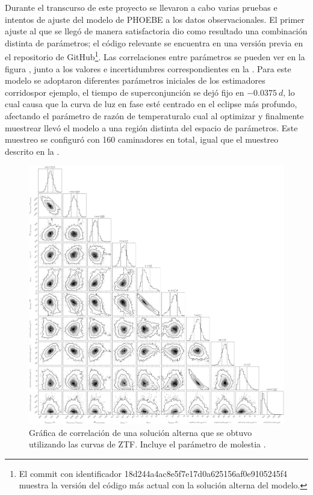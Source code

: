 Durante el transcurso de este proyecto se llevaron a cabo varias pruebas e
intentos de ajuste del modelo de PHOEBE a los datos observacionales. El primer
ajuste al que se llegó de manera satisfactoria dio como resultado una
combinación distinta de parámetros; el código relevante se encuentra en una
versión previa en el repositorio de GitHub\footnote{El commit con identificador
18d244a4ac8e5f7e17d0a625156af0e9105245f4 muestra la versión del código más
actual con la solución alterna del modelo.}. Las correlaciones entre parámetros
se pueden ver en la figura , junto a los
valores e incertidumbres correspondientes en la
. Para este modelo se adoptaron
diferentes parámetros iniciales de los estimadores corridos\textemdash por
ejemplo, el tiempo de superconjunción se dejó fijo en $-0.0375 \ d$, lo cual
causa que la curva de luz en fase esté centrado en el eclipse más profundo,
afectando el parámetro de razón de temperatura\textemdash lo cual al optimizar y
finalmente muestrear llevó el modelo a una región distinta del espacio de
parámetros. Este muestreo se configuró con 160 caminadores en total, igual que
el muestreo descrito en la
.

\begin{figure}[!ht]
    \centering
    \includegraphics[scale=0.27]{Conclusion/Figures/Figura Alt Solucion MCMC ZTF.png}
    \caption{Gráfica de correlación de una solución alterna que se obtuvo
    utilizando las curvas de ZTF. Incluye el parámetro de molestia
    .}
    \label{figuraAltMcmcResultadosZtf}
\end{figure}

